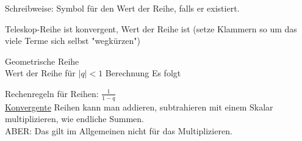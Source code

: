 \documentclass{../tudscript}
\begin{document}
		Schreibweise:
		Symbol für den Wert der Reihe, falls er existiert.
		
		Teleskop-Reihe
		ist konvergent, Wert der Reihe ist
		(setze Klammern so um das viele Terme sich selbst "wegkürzen")
		
		Geometrische Reihe\\
		Wert der Reihe für $|q| < 1$
		Berechnung
		Es folgt
	
		Rechenregeln für Reihen: $\frac{1}{1-q}$\\
		\underline{Konvergente} Reihen kann man addieren, subtrahieren mit einem Skalar multiplizieren, wie endliche Summen. \\
		
		ABER: Das gilt im Allgemeinen nicht für das Multiplizieren.
\end{document}

